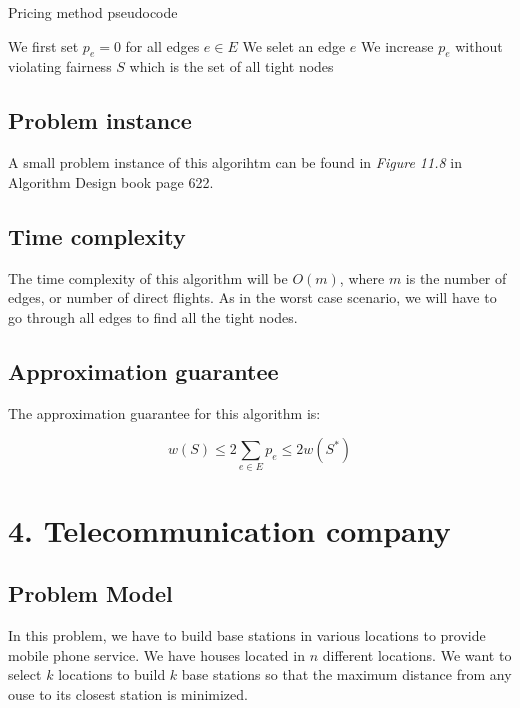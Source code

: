 \documentclass{article}
\begin{document}
\begin{algorithm}[H]
\caption{Pricing method pseudocode}
\begin{algorithmic}[1]
\State We first set $p_e = 0$ for all edges $e\in E$
 \State We selet an edge $e$
 \State We increase $p_e$ without violating fairness
\EndWhile
\State \Return $S$ which is the set of all tight nodes
\end{algorithmic}
\end{algorithm}

\subsection*{Problem instance}

A small problem instance of this algorihtm can be found in \textit{Figure 11.8} in Algorithm Design book page 622.

\subsection*{Time complexity}

The time complexity of this algorithm will be $O(m)$, where $m$ is the number of edges, or number of direct flights. As in the worst case scenario, we will have to go through all edges to find all the tight nodes.

\subsection*{Approximation guarantee}

The approximation guarantee for this algorithm is:

$$w(S)\leq 2\sum_{e\in E}^{} p_e\leq 2w(S^{\ast})$$

\section*{4. Telecommunication company}

\subsection*{Problem Model}

In this problem, we have to build base stations in various locations to provide mobile phone service. We have houses located in $n$ different locations. We want to select $k$ locations to build $k$ base stations so that the maximum distance from any ouse to its closest station is minimized.
\end{document}

